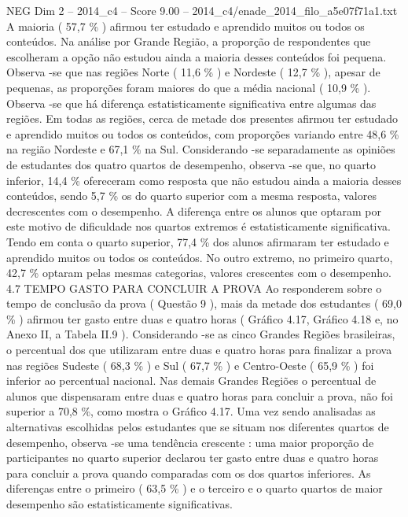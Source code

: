 \begin{textsample}{NEG Dim 2 – 2014\_c4 – Score 9.00 – 2014\_c4/enade\_2014\_filo\_a5e07f71a1.txt}
A maioria ( 57,7 \% ) afirmou ter estudado e aprendido muitos ou todos os conteúdos.
Na análise por Grande Região, a proporção de respondentes que escolheram a opção não estudou ainda a maioria desses conteúdos foi pequena.
Observa -se que nas regiões Norte ( 11,6 \% ) e Nordeste ( 12,7 \% ), apesar de pequenas, as proporções foram maiores do que a média nacional ( 10,9 \% ).
Observa -se que há diferença estatisticamente significativa entre algumas das regiões.
Em todas as regiões, cerca de metade dos presentes afirmou ter estudado e aprendido muitos ou todos os conteúdos, com proporções variando entre 48,6 \% na região Nordeste e 67,1 \% na Sul.
Considerando -se separadamente as opiniões de estudantes dos quatro quartos de desempenho, observa -se que, no quarto inferior, 14,4 \% ofereceram como resposta que não estudou ainda a maioria desses conteúdos, sendo 5,7 \% os do quarto superior com a mesma resposta, valores decrescentes com o desempenho.
A diferença entre os alunos que optaram por este motivo de dificuldade nos quartos extremos é estatisticamente significativa.
Tendo em conta o quarto superior, 77,4 \% dos alunos afirmaram ter estudado e aprendido muitos ou todos os conteúdos.
No outro extremo, no primeiro quarto, 42,7 \% optaram pelas mesmas categorias, valores crescentes com o desempenho. 4.7 TEMPO GASTO PARA CONCLUIR A PROVA Ao responderem sobre o tempo de conclusão da prova ( Questão 9 ), mais da metade dos estudantes ( 69,0 \% ) afirmou ter gasto entre duas e quatro horas ( Gráfico 4.17, Gráfico 4.18 e, no Anexo II, a Tabela II.9 ).
Considerando -se as cinco Grandes Regiões brasileiras, o percentual dos que utilizaram entre duas e quatro horas para finalizar a prova nas regiões Sudeste ( 68,3 \% ) e Sul ( 67,7 \% ) e Centro-Oeste ( 65,9 \% ) foi inferior ao percentual nacional.
Nas demais Grandes Regiões o percentual de alunos que dispensaram entre duas e quatro horas para concluir a prova, não foi superior a 70,8 \%, como mostra o Gráfico 4.17.
Uma vez sendo analisadas as alternativas escolhidas pelos estudantes que se situam nos diferentes quartos de desempenho, observa -se uma tendência crescente : uma maior proporção de participantes no quarto superior declarou ter gasto entre duas e quatro horas para concluir a prova quando comparadas com os dos quartos inferiores.
As diferenças entre o primeiro ( 63,5 \% ) e o terceiro e o quarto quartos de maior desempenho são estatisticamente significativas.

\end{textsample}
